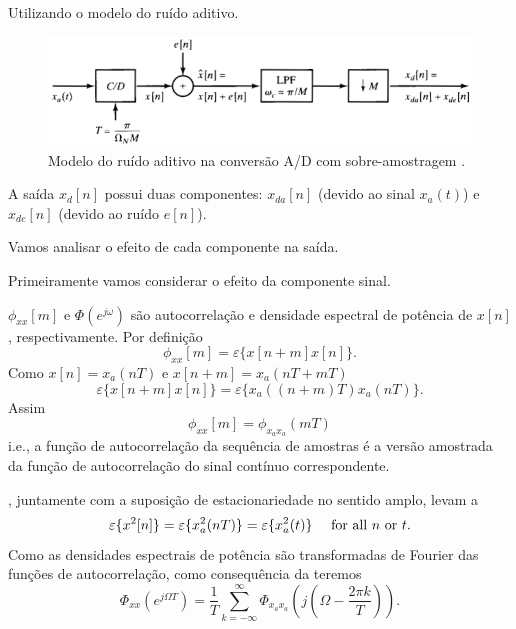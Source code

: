\begin{frame}[allowframebreaks]
  Utilizando o modelo do ruído aditivo.
  \begin{figure}[h!]
  \centering
  \includegraphics[width=\textwidth]{images/oppenheim_fig457.png}
  \caption{Modelo do ruído aditivo na conversão A/D com sobre-amostragem \citep{oppenheim2009}.}
  \label{fig:oppenheim_fig457}
  \end{figure}
  A saída $x_d[n]$ possui duas componentes: $x_{da}[n]$ (devido ao sinal $x_a(t)$) e $x_{de}[n]$ (devido ao ruído $e[n]$).

  Vamos analisar o efeito de cada componente na saída.

  \framebreak 

  Primeiramente vamos considerar o efeito da componente sinal.

  $\phi_{xx}[m]$ e $\Phi(e^{j\omega})$ são autocorrelação e densidade espectral de potência de $x[n]$, respectivamente.
  Por definição
  \begin{equation}
  \phi_{xx}[m] = \varepsilon\{x[n+m] x[n]\} .
  \end{equation}
  Como $x[n]=x_a(nT)$ e $x[n+m]=x_a(nT+mT)$
  \begin{equation}
  \label{eq-exp-xx}
  \varepsilon\{x[n+m] x[n]\} = \varepsilon\{x_a((n+m)T) x_a(nT)\} .
  \end{equation}
  Assim
  \begin{equation}
  \label{eq-phixxm}
  \phi_{xx}[m] = \phi_{x_a x_a} (mT)
  \end{equation}
  i.e., a função de autocorrelação da sequência de amostras é a versão amostrada da
  função de autocorrelação do sinal contínuo correspondente.

  \framebreak

  , juntamente com a suposição de estacionariedade no sentido amplo, levam a 
  \begin{equation}
  \varepsilon\{x^2[n]\} = \varepsilon\{x_a^2(nT)\} = \varepsilon\{x_a^2(t)\} \quad \textmd{ for all } n \textmd{ or } t.
  \end{equation}
  Como as densidades espectrais de potência são transformadas de Fourier das funções de autocorrelação,
  como consequência da  teremos
  \begin{equation}
  \label{eq-Phixx}
  \Phi_{xx}(e^{j\Omega T}) = \frac{1}{T} \sum_{k=-\infty}^{\infty} \Phi_{x_a x_a} \left( j \left( \Omega - \frac{2\pi k}{T} \right) \right) .
  \end{equation}


\end{frame}
